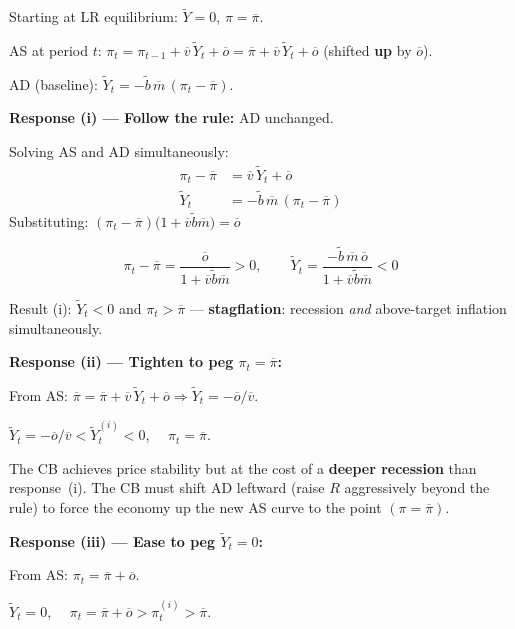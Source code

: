 \documentclass[letterpaper,12pt]{article}
\begin{document}
\noindent Starting at LR equilibrium: $\widetilde{Y}=0$, $\pi = \overline{\pi}$.

\noindent AS at period $t$: $\pi_t = \pi_{t-1} + \overline{v}\,\widetilde{Y}_t + \overline{o} = \overline{\pi} + \overline{v}\,\widetilde{Y}_t + \overline{o}$ (shifted \textbf{up} by $\overline{o}$).

\noindent AD (baseline): $\widetilde{Y}_t = -\tilde{b}\,\overline{m}\,(\pi_t - \overline{\pi})$.

\medskip
\noindent\textbf{Response (i) --- Follow the rule:} AD unchanged.

Solving AS and AD simultaneously:
\begin{align*}
\pi_t - \overline{\pi} &= \overline{v}\,\widetilde{Y}_t + \overline{o} \\
\widetilde{Y}_t &= -\tilde{b}\,\overline{m}\,(\pi_t - \overline{\pi})
\end{align*}
Substituting: $(\pi_t - \overline{\pi})\bigl(1 + \overline{v}\tilde{b}\overline{m}\bigr) = \overline{o}$

\textcolor{sol}{
\[
\pi_t - \overline{\pi} = \frac{\overline{o}}{1 + \overline{v}\tilde{b}\overline{m}} > 0, \qquad \widetilde{Y}_t = \frac{-\tilde{b}\,\overline{m}\,\overline{o}}{1 + \overline{v}\tilde{b}\overline{m}} < 0
\]
}

Result (i): $\widetilde{Y}_t < 0$ and $\pi_t > \overline{\pi}$ --- \textbf{stagflation}: recession \emph{and} above-target inflation simultaneously.

\medskip
\noindent\textbf{Response (ii) --- Tighten to peg $\pi_t = \overline{\pi}$:}

From AS: $\overline{\pi} = \overline{\pi} + \overline{v}\,\widetilde{Y}_t + \overline{o} \Rightarrow \widetilde{Y}_t = -\overline{o}/\overline{v}$.

\textcolor{sol}{$\widetilde{Y}_t = -\overline{o}/\overline{v} < \widetilde{Y}_t^{(i)} < 0$, $\quad \pi_t = \overline{\pi}$.}

The CB achieves price stability but at the cost of a \textbf{deeper recession} than response~(i). The CB must shift AD leftward (raise $R$ aggressively beyond the rule) to force the economy up the new AS curve to the point $(\pi = \overline{\pi})$.

\medskip
\noindent\textbf{Response (iii) --- Ease to peg $\widetilde{Y}_t = 0$:}

From AS: $\pi_t = \overline{\pi} + \overline{o}$.

\textcolor{sol}{$\widetilde{Y}_t = 0$, $\quad \pi_t = \overline{\pi} + \overline{o} > \pi_t^{(i)} > \overline{\pi}$.}
\end{document}
